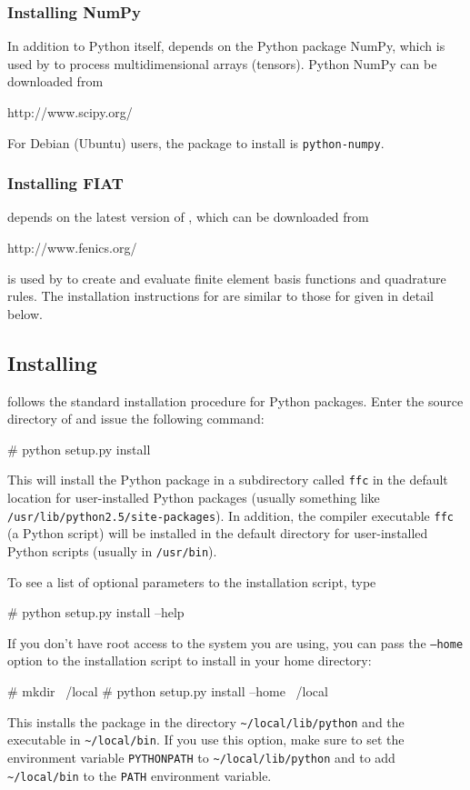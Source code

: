 \subsubsection{Installing NumPy}

In addition to Python itself, \ffc{} depends on the Python package NumPy,
which is used by \ffc{} to process multidimensional arrays (tensors).
Python NumPy can be downloaded from
\begin{code}
http://www.scipy.org/
\end{code}
For Debian (Ubuntu) users, the package to install is \texttt{python-numpy}.

\subsubsection{Installing FIAT}

\ffc{} depends on the latest version of \fiat{}, which can be
downloaded from
\begin{code}
http://www.fenics.org/
\end{code}
\fiat{} is used by \ffc{} to create and evaluate finite element basis
functions and quadrature rules.
The installation instructions for \fiat{} are similar to those for
\ffc{} given in detail below.



\subsection{Installing \ffc{}}

\ffc{} follows the standard installation procedure for Python
packages. Enter the source directory of \ffc{} and issue the
following command:
\begin{code}
# python setup.py install
\end{code}
This will install the \ffc{} Python package in a subdirectory called
\texttt{ffc} in the default location for user-installed Python
packages (usually something like
\texttt{/usr/lib/python2.5/site-packages}).  In addition, the compiler
executable \texttt{ffc} (a Python script) will be installed in the
default directory for user-installed Python scripts (usually in
\texttt{/usr/bin}).

To see a list of optional parameters to the installation script, type
\begin{code}
# python setup.py install --help
\end{code}
If you don't have root access to the system you are using, you can
pass the \texttt{--home} option to the installation script to install
\ffc{} in your home directory:
\begin{code}
# mkdir ~/local
# python setup.py install --home ~/local
\end{code}
This installs the \ffc{} package in the directory \texttt{\~{}/local/lib/python}
and the \ffc{} executable in \texttt{\~{}/local/bin}. If you use this
option, make sure to set the environment variable \texttt{PYTHONPATH}
to \texttt{\~{}/local/lib/python} and to add \texttt{\~{}/local/bin}
to the \texttt{PATH} environment variable.


